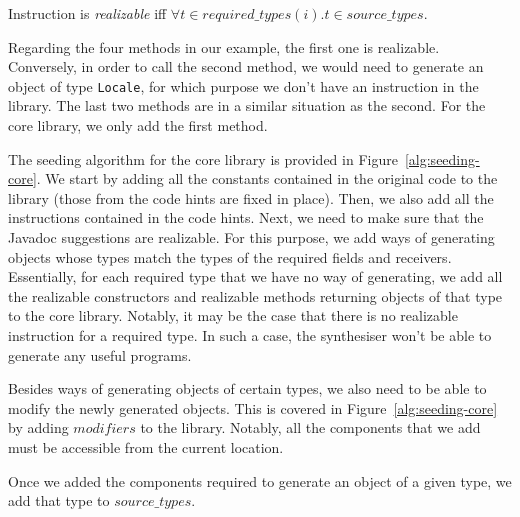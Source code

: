 \documentclass[sigconf,review,anonymous]{acmart}
\begin{document}

\begin{definition}\label{def:realizable}
Instruction  is {\em realizable} iff $\forall t \in required\_types(i). t \in source\_types$.
  
\end{definition}

Regarding the four methods in our example, the first one is realizable. Conversely, in order to call the second method, we would need to generate an object of type \texttt{Locale},
for which purpose we don't have an instruction in the library.
The last two methods are in a similar situation as the second. For the core library, we only add the first method.


The seeding algorithm for the core library is provided in Figure~\ref{alg:seeding-core}.
We start by adding all the constants contained in the original code to the library
(those from the code hints are fixed in place).
Then, we also add all the instructions contained
in the code hints. Next, we need to make sure that the Javadoc suggestions
are realizable. For this purpose, we add ways of generating
objects whose types match the types of the required fields and receivers.
%
Essentially, for each required type that we have no way of generating, we add all the realizable
constructors and realizable methods returning objects of that type to the
core library.
Notably, it may be the case that there is no realizable instruction for a required type.
In such a case, the synthesiser won't be able to generate any useful programs.

Besides ways of generating objects of certain types, we also need to be able to
modify the newly generated objects. This is covered in Figure~\ref{alg:seeding-core}
by adding $modifiers$ to the library. Notably, all the components that
we add must be accessible from the current location.

Once we added the components required to generate an object of a given type,
we add that type to $source\_types$.
\end{document}
